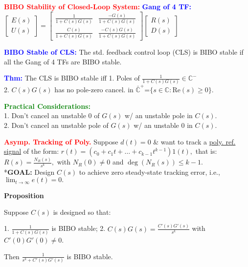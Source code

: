 \documentclass[5pt]{extarticle} %
\begin{document}
\begin{paracol}{3}
{    \textcolor{red}{\textbf{BIBO Stability of Closed-Loop System:}} \textcolor{blue}{\textbf{Gang of 4 TF:}} \\
    $\begin{bmatrix}
        E(s) \\
        U(s)
    \end{bmatrix} =
    \begin{bmatrix}
        \frac{1}{1+C(s)G(s)} & \frac{-G(s)}{1+C(s)G(s)} \\
        \frac{C(s)}{1+C(s)G(s)} & \frac{-C(s)G(s)}{1+C(s)G(s)}
    \end{bmatrix} 
    \begin{bmatrix}
        R(s) \\
        D(s)
    \end{bmatrix}
    $ 

    \textcolor{blue}{\textbf{BIBO Stable of CLS:}} The std. feedback control loop (CLS) is BIBO stable if all the Gang of 4 TFs are BIBO stable.

    \textcolor{blue}{\textbf{Thm:}} The CLS is BIBO stable iff 1. Poles of $\frac{1}{1 + C(s)G(s)} \in \mathbb{C}^{-}$ \\
    2. $C(s)G(s)$ has no pole-zero cancel. in $\bar{\mathbb{C}}^{+} \text{=} \{ s \in \mathbb{C} : \text{Re}(s) \geq 0 \}$. 

    \textcolor{green}{\textbf{Practical Considerations:}} \\
    1. Don't cancel an unstable 0 of $G(s)$ w/ an unstable pole in $C(s)$. \\
    2. Don't cancel an unstable pole of $G(s)$ w/ an unstable 0 in $C(s)$. 

    \textcolor{red}{\textbf{Asymp. Tracking of Poly.}} Suppose $d(t) = 0$ \& want to track a \underline{poly. ref. signal} of the form:  
    $r(t) = (c_0 + c_1 t + \dots + c_{k-1} t^{k-1}) 1(t),$  
    that is:  
    $R(s) = \frac{N_R(s)}{s^k},$ with $N_R(0) \neq 0$ and $\deg(N_R(s)) \leq k-1.$  \\
    *\textbf{GOAL:} Design $C(s)$ to achieve zero steady-state tracking error, i.e., $\lim_{t \to \infty} e(t) = 0.$ 

    \textbf{Proposition}

    Suppose $C(s)$ is designed so that:

    1. $\frac{1}{1 + C(s) G(s)}$ is BIBO stable;
    2. $C(s) G(s) = \frac{C'(s) G'(s)}{s^k}$ with $C'(0) G'(0) \neq 0$.

    Then $\frac{1}{s^k + C'(s) G'(s)}$ is BIBO stable.


}
\end{paracol}
\end{document}

